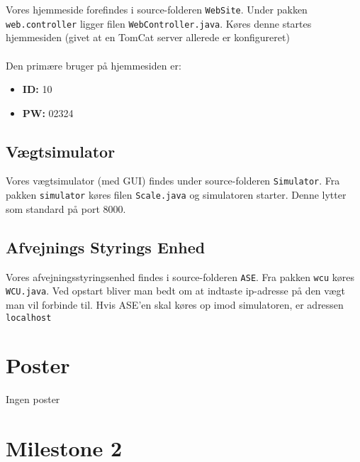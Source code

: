 \documentclass[a4paper]{article}
\begin{document}
Vores hjemmeside forefindes i source-folderen \texttt{WebSite}. Under pakken \texttt{web.controller} ligger filen \texttt{WebController.java}. Køres denne startes hjemmesiden (givet at en TomCat server allerede er konfigureret)
\\
\\
Den primære bruger på hjemmesiden er:
\begin{itemize}
  \item \textbf{ID:} 10
  \item \textbf{PW:} 02324
\end{itemize}


\subsection*{Vægtsimulator} %

Vores vægtsimulator (med GUI) findes under source-folderen \texttt{Simulator}. Fra pakken \texttt{simulator} køres filen \texttt{Scale.java} og simulatoren starter. Denne lytter som standard på port 8000.


\subsection*{Afvejnings Styrings Enhed} %
\label{sub:Afvejnings Styrings Enhed}

Vores afvejningsstyringsenhed findes i source-folderen \texttt{ASE}. Fra pakken \texttt{wcu} køres \texttt{WCU.java}. Ved opstart bliver man bedt om at indtaste ip-adresse på den vægt man vil forbinde til. Hvis ASE'en skal køres op imod simulatoren, er adressen \texttt{localhost}



\clearpage

\section{Poster} %

Ingen poster


\clearpage

\section{Milestone 2} %
\end{document}

